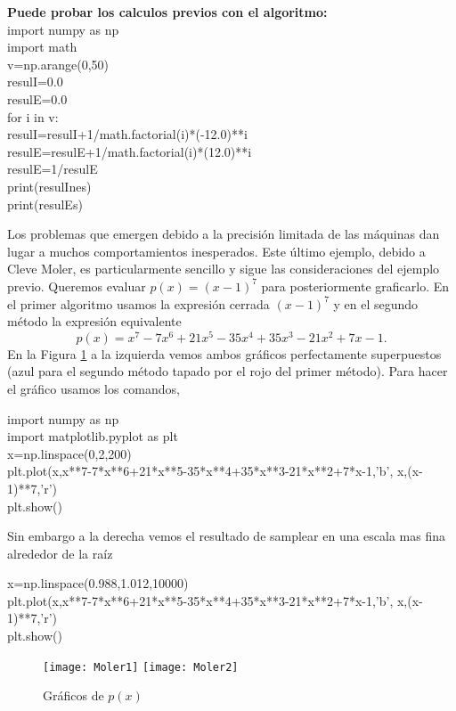 \begin{tcolorbox}{\bf Puede probar los calculos previos con el algoritmo:}\\
\noindent import numpy as np\\
import math     \\
v=np.arange(0,50)\\
resulI=0.0 \\
resulE=0.0 \\
for i in v:\\

\qquad resulI=resulI+1/math.factorial(i)*(-12.0)**i\\

\qquad resulE=resulE+1/math.factorial(i)*(12.0)**i   \\
resulE=1/resulE \\
print(resulInes)\\
print(resulEs)
\end{tcolorbox}
Los problemas que emergen debido a la precisión limitada de las máquinas dan lugar a muchos comportamientos inesperados. Este último ejemplo, debido a Cleve Moler, es particularmente sencillo y sigue las consideraciones del ejemplo previo. Queremos evaluar $p(x)=(x-1)^7$ para posteriormente graficarlo.
En el primer algoritmo usamos la expresión cerrada $(x-1)^7$  y en el segundo método la expresión equivalente
$$
p(x)=x^7-7x^6+21x^5-35x^4+35x^3-21x^2+7x-1.
$$
En la Figura \ref{fig:moler} a la izquierda vemos ambos gráficos perfectamente superpuestos (azul para el segundo método tapado por el rojo del primer método). Para hacer el gráfico usamos los comandos,

\noindent import numpy as np\\
import matplotlib.pyplot as plt\\
x=np.linspace(0,2,200)\\
plt.plot(x,x**7-7*x**6+21*x**5-35*x**4+35*x**3-21*x**2+7*x-1,'b', x,(x-1)**7,'r')\\
plt.show()

\noindent Sin embargo a la derecha vemos el resultado de samplear en una escala mas fina alrededor de la raíz

\noindent x=np.linspace(0.988,1.012,10000)\\
plt.plot(x,x**7-7*x**6+21*x**5-35*x**4+35*x**3-21*x**2+7*x-1,'b', x,(x-1)**7,'r')\\
plt.show()

\begin{figure}
\label{fig:moler}
\texttt{[image: Moler1]}
\texttt{[image: Moler2]}
\caption{Gráficos de $p(x)$}
\end{figure}



